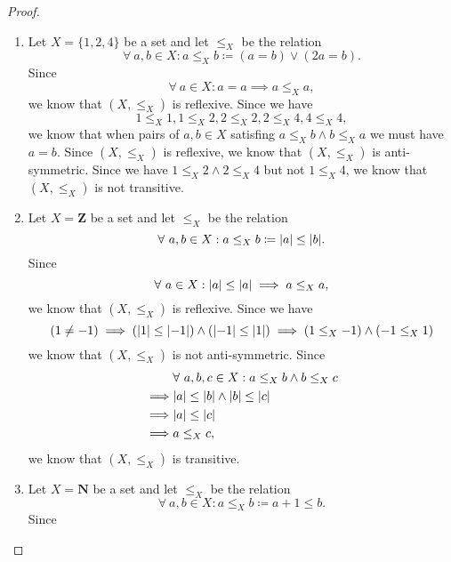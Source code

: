 \begin{proof}
    \begin{enumerate}
        \item Let \(X = \{1, 2, 4\}\) be a set and let \(\leq_X\) be the relation
              \[
                  \forall\ a, b \in X : a \leq_X b \coloneqq (a = b) \lor (2a = b).
              \]
              Since
              \[
                  \forall\ a \in X : a = a \implies a \leq_X a,
              \]
              we know that \((X, \leq_X)\) is reflexive.
              Since we have
              \[
                  1 \leq_X 1, 1 \leq_X 2, 2 \leq_X 2, 2 \leq_X 4, 4 \leq_X 4,
              \]
              we know that when pairs of \(a, b \in X\) satisfing \(a \leq_X b \land b \leq_X a\) we must have \(a = b\).
              Since \((X, \leq_X)\) is reflexive, we know that \((X, \leq_X)\) is anti-symmetric.
              Since we have \(1 \leq_X 2 \land 2 \leq_X 4\) but not \(1 \leq_X 4\), we know that \((X, \leq_X)\) is not transitive.
        \item Let \(X = \mathbf{Z}\) be a set and let \(\leq_X\) be the relation
              \[
                  \forall\ a, b \in X : a \leq_X b \coloneqq \abs*{a} \leq \abs*{b}.
              \]
              Since
              \[
                  \forall\ a \in X : \abs*{a} \leq \abs*{a} \implies a \leq_X a,
              \]
              we know that \((X, \leq_X)\) is reflexive.
              Since we have
              \[
                  (1 \neq -1) \implies (\abs*{1} \leq \abs*{-1}) \land (\abs*{-1} \leq \abs*{1}) \implies (1 \leq_X -1) \land (-1 \leq_X 1)
              \]
              we know that \((X, \leq_X)\) is not anti-symmetric.
              Since
              \begin{align*}
                           & \forall\ a, b, c \in X : a \leq_X b \land b \leq_X c \\
                  \implies & \abs*{a} \leq \abs*{b} \land \abs*{b} \leq \abs*{c}  \\
                  \implies & \abs*{a} \leq \abs*{c}                               \\
                  \implies & a \leq_X c,
              \end{align*}
              we know that \((X, \leq_X)\) is transitive.
        \item Let \(X = \mathbf{N}\) be a set and let \(\leq_X\) be the relation
              \[
                  \forall\ a, b \in X : a \leq_X b \coloneqq a + 1 \leq b.
              \]
              Since

\end{enumerate}
\end{proof}
